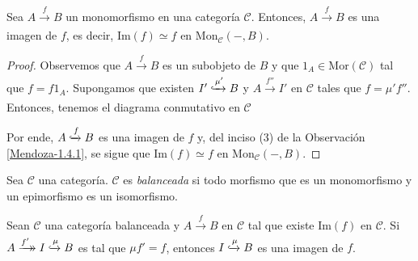 \documentclass[tesis]{subfiles}
\begin{document}
\begin{Prop}\label{Mendoza-Ejer.19}
    Sea $A\xrightarrow[]{f}B$ un monomorfismo en una categoría $\mathscr{C}$. Entonces, $A\xrightarrow[]{f}B$ es una imagen de $f$, es decir, $\text{Im}(f)\simeq f$ en $\text{Mon}_\mathscr{C}(-,B)$.
\end{Prop}

\begin{proof}
    Observemos que $A\xrightarrow[]{f}B$ es un subobjeto de $B$ y que $1_A\in\text{Mor}(\mathscr{C})$ tal que $f=f1_A$. Supongamos que existen $I'\xhookrightarrow{\mu'} B$ y $A\xrightarrow[]{f''} I'$ en $\mathscr{C}$ tales que $f=\mu'f''$. Entonces, tenemos el diagrama conmutativo en $\mathscr{C}$
    \begin{center}
    \end{center}
    Por ende, $A\xhookrightarrow{f}B$ es una imagen de $f$ y, del inciso (3) de la Observación \ref{Mendoza-1.4.1}, se sigue que $\text{Im}(f)\simeq f$ en $\text{Mon}_\mathscr{C}(-,B)$.
\end{proof}

\begin{Def}\label{Def: Categoría balanceada}
    Sea $\mathscr{C}$ una categoría. $\mathscr{C}$ es \emph{balanceada} si todo morfismo que es un monomorfismo y un epimorfismo es un isomorfismo.
\end{Def}

\begin{Prop}\label{Mendoza-1.4.3}
    Sean $\mathscr{C}$ una categoría balanceada y $A\xrightarrow[]{f}B$ en $\mathscr{C}$ tal que existe $\text{Im}(f)$ en $\mathscr{C}$. Si $A\xrightarrow[]{f'}\mathrel{\mkern-14mu}\rightarrow I\xhookrightarrow{\mu}B$ es tal que $\mu f'=f$, entonces $I\xhookrightarrow{\mu}B$ es una imagen de $f$.
\end{Prop}
\end{document}
